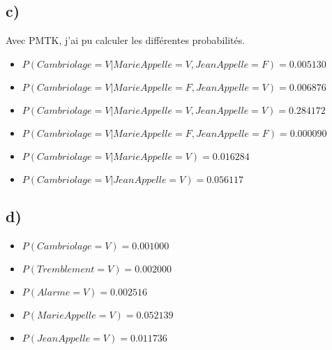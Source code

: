 \documentclass[12pt]{article}
\begin{document}
\subsection{c)}
Avec PMTK, j'ai pu calculer les différentes probabilités.
\begin{itemize}
\item $ P(Cambriolage=V|MarieAppelle=V, JeanAppelle=F) = 0.005130 $
\item $ P(Cambriolage=V|MarieAppelle=F, JeanAppelle=V) = 0.006876 $
\item $ P(Cambriolage=V|MarieAppelle=V, JeanAppelle=V) = 0.284172 $
\item $ P(Cambriolage=V|MarieAppelle=F, JeanAppelle=F) = 0.000090 $
\item $ P(Cambriolage=V|MarieAppelle=V) = 0.016284 $
\item $ P(Cambriolage=V|JeanAppelle=V) = 0.056117 $
\end{itemize}
\subsection{d)}
\begin{itemize}
\item $ P(Cambriolage=V) = 0.001000 $
\item $ P(Tremblement=V) = 0.002000 $
\item $ P(Alarme=V) = 0.002516 $
\item $ P(MarieAppelle=V) = 0.052139 $
\item $ P(JeanAppelle=V) = 0.011736 $
\end{itemize}
\end{document}
